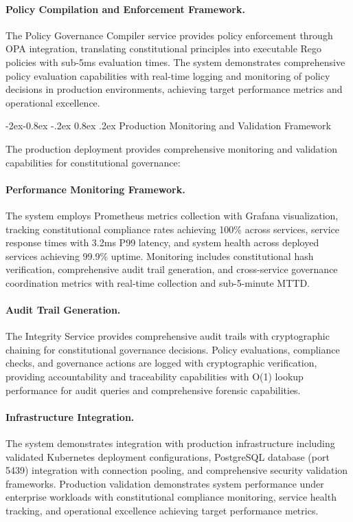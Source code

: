 \documentclass[manuscript,screen,9pt]{acmart}
\makeatletter
\renewcommand\subsubsection{\@startsection{subsubsection}{3}{\z@}%
  {-2ex\@plus -0.8ex \@minus -.2ex}%
  {0.8ex \@plus .2ex}%
  {\normalfont\normalsize\bfseries}}
\makeatother
\begin{document}
\paragraph{Policy Compilation and Enforcement Framework.} The Policy Governance Compiler service provides policy enforcement through OPA integration, translating constitutional principles into executable Rego policies with sub-5ms evaluation times. The system demonstrates comprehensive policy evaluation capabilities with real-time logging and monitoring of policy decisions in production environments, achieving target performance metrics and operational excellence.

\subsubsection{Production Monitoring and Validation Framework}
\label{subsubsec:production_monitoring}

The production deployment provides comprehensive monitoring and validation capabilities for constitutional governance:

\paragraph{Performance Monitoring Framework.} The system employs Prometheus metrics collection with Grafana visualization, tracking constitutional compliance rates achieving 100\% across services, service response times with 3.2ms P99 latency, and system health across deployed services achieving 99.9\% uptime. Monitoring includes constitutional hash verification, comprehensive audit trail generation, and cross-service governance coordination metrics with real-time collection and sub-5-minute MTTD.

\paragraph{Audit Trail Generation.} The Integrity Service provides comprehensive audit trails with cryptographic chaining for constitutional governance decisions. Policy evaluations, compliance checks, and governance actions are logged with cryptographic verification, providing accountability and traceability capabilities with O(1) lookup performance for audit queries and comprehensive forensic capabilities.

\paragraph{Infrastructure Integration.} The system demonstrates integration with production infrastructure including validated Kubernetes deployment configurations, PostgreSQL database (port 5439) integration with connection pooling, and comprehensive security validation frameworks. Production validation demonstrates system performance under enterprise workloads with constitutional compliance monitoring, service health tracking, and operational excellence achieving target performance metrics.
\end{document}
